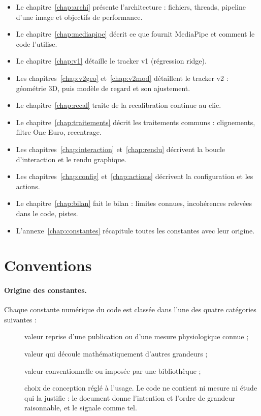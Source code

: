 \begin{itemize}
  \item Le chapitre~\ref{chap:archi} présente l'architecture : fichiers, threads, pipeline d'une image et objectifs de performance.
  \item Le chapitre~\ref{chap:mediapipe} décrit ce que fournit MediaPipe et comment le code l'utilise.
  \item Le chapitre~\ref{chap:v1} détaille le tracker v1 (régression ridge).
  \item Les chapitres~\ref{chap:v2geo} et~\ref{chap:v2mod} détaillent le tracker v2 : géométrie 3D, puis modèle de regard et son ajustement.
  \item Le chapitre~\ref{chap:recal} traite de la recalibration continue au clic.
  \item Le chapitre~\ref{chap:traitements} décrit les traitements communs : clignements, filtre One Euro, recentrage.
  \item Les chapitres~\ref{chap:interaction} et~\ref{chap:rendu} décrivent la boucle d'interaction et le rendu graphique.
  \item Les chapitres~\ref{chap:config} et~\ref{chap:actions} décrivent la configuration et les actions.
  \item Le chapitre~\ref{chap:bilan} fait le bilan : limites connues, incohérences relevées dans le code, pistes.
  \item L'annexe~\ref{chap:constantes} récapitule toutes les constantes avec leur origine.
\end{itemize}

\section{Conventions}

\paragraph{Origine des constantes.} Chaque constante numérique du code est classée dans l'une des quatre catégories suivantes :
\begin{description}
  \item[\litt] valeur reprise d'une publication ou d'une mesure physiologique connue ;
  \item[\deriv] valeur qui découle mathématiquement d'autres grandeurs ;
  \item[\conv] valeur conventionnelle ou imposée par une bibliothèque ;
  \item[\empi] choix de conception réglé à l'usage. Le code ne contient ni mesure ni étude qui la justifie : le document donne l'intention et l'ordre de grandeur raisonnable, et le signale comme tel.
\end{description}

